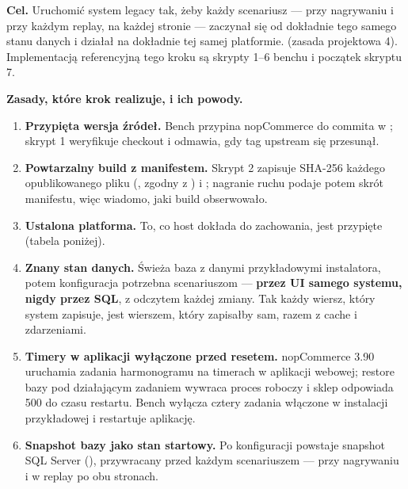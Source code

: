 \textbf{Cel.} Uruchomić system legacy tak, żeby każdy scenariusz --- przy nagrywaniu i
przy każdym replay, na każdej stronie --- zaczynał się od dokładnie tego samego stanu
danych i działał na dokładnie tej samej platformie.  (zasada projektowa 4).
Implementacją referencyjną tego kroku są skrypty 1--6 benchu i początek skryptu 7.

\textbf{Zasady, które krok realizuje, i ich powody.}
\begin{enumerate}
  \item \textbf{Przypięta wersja źródeł.} Bench przypina nopCommerce
         do commita  w ; skrypt 1
        weryfikuje checkout i odmawia, gdy tag upstream się przesunął.
  \item \textbf{Powtarzalny build z manifestem.} Skrypt 2 zapisuje SHA-256 każdego
        opublikowanego pliku (, zgodny z
        ) i ; nagranie ruchu podaje potem
        skrót manifestu, więc wiadomo, jaki build obserwowało.
  \item \textbf{Ustalona platforma.} To, co host dokłada do zachowania, jest przypięte
        (tabela poniżej).
  \item \textbf{Znany stan danych.} Świeża baza z danymi przykładowymi instalatora, potem
        konfiguracja potrzebna scenariuszom --- \textbf{przez UI samego systemu, nigdy
        przez SQL}, z odczytem każdej zmiany. Tak każdy wiersz, który system zapisuje, jest
        wierszem, który zapisałby sam, razem z cache i zdarzeniami.
  \item \textbf{Timery w aplikacji wyłączone przed resetem.} nopCommerce 3.90 uruchamia
        zadania harmonogramu na timerach w aplikacji webowej; restore bazy pod działającym
        zadaniem wywraca proces roboczy i sklep odpowiada 500 do czasu restartu. Bench
        wyłącza cztery zadania włączone w instalacji przykładowej i restartuje aplikację.
  \item \textbf{Snapshot bazy jako stan startowy.} Po konfiguracji powstaje snapshot SQL
        Server (), przywracany przed każdym
        scenariuszem --- przy nagrywaniu i w replay po obu stronach.
\end{enumerate}

